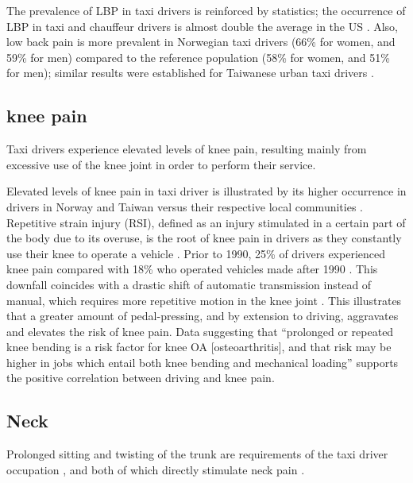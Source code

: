 \documentclass[11pt]{article}
\begin{document}
The prevalence of LBP in taxi drivers is reinforced by statistics; the occurrence of LBP 
in taxi and chauffeur drivers is almost double the average in the US \cite{68}. Also, low 
back pain is more prevalent in Norwegian taxi drivers (66\% for women, and 59\% for men) 
compared to the reference population (58\% for women, and 51\% for men); similar results 
were established for Taiwanese urban taxi drivers \cite{Question?}.

 
\subsection{knee pain}
Taxi drivers experience elevated levels of knee pain, resulting mainly from excessive use 
of the knee joint in order to perform their service. 

Elevated levels of knee pain in taxi driver is illustrated by its higher occurrence in drivers 
in Norway and Taiwan versus their respective local communities \cite{KneePain}. Repetitive strain 
injury (RSI), defined as an injury stimulated in a certain part of the body due to its overuse, is the 
root of knee pain in drivers \cite{RSI} as they constantly use their knee to operate a vehicle 
\cite{KneePain}. Prior to 1990, 25\% of drivers experienced knee pain compared with 18\% who 
operated vehicles made after 1990 \cite{KneePain}. This downfall coincides with a drastic shift of 
automatic transmission instead of manual, which requires more repetitive motion in the knee joint 
\cite{KneePain}. This illustrates that a greater amount of pedal-pressing, and by extension to 
driving, aggravates and elevates the risk of knee pain. Data suggesting that “prolonged or repeated 
knee bending is a risk factor for knee OA [osteoarthritis], and that risk may be higher in jobs which 
entail both knee bending and mechanical loading” \cite{Osteoarthritis} supports the positive correlation 
between driving and knee pain.



\subsection{Neck}
Prolonged sitting and twisting of the trunk are requirements of the taxi driver occupation \cite{neck}, 
and both of which directly stimulate neck pain \cite{neck}. 
\end{document}
